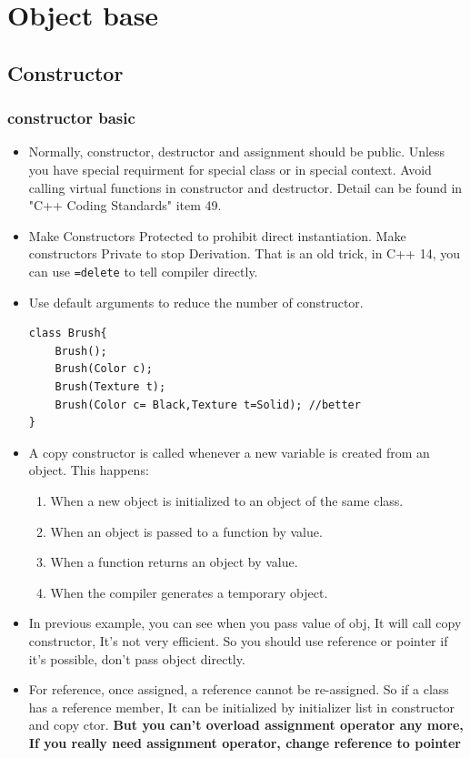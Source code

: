 \documentclass[a4paper,11pt,twoside]{book}
\begin{document}
\section{Object base}
\subsection{Constructor}

\subsubsection{constructor basic}

\begin{itemize}
	\item Normally, constructor, destructor and assignment should be public. Unless you have special requirment for special class or in special context. Avoid calling virtual functions in constructor and destructor. Detail can be found in "C++ Coding Standards" item 49.
	
	\item Make Constructors Protected to prohibit direct instantiation. Make constructors Private to stop Derivation. That is an old trick, in C++ 14, you can use \texttt{=delete} to tell compiler directly.
	
	\item Use default arguments to reduce the number of constructor.
\begin{lstlisting}[numbers=none]
class Brush{
	Brush();
	Brush(Color c);
	Brush(Texture t);
	Brush(Color c= Black,Texture t=Solid); //better
}
\end{lstlisting}
		
		\item A copy constructor is called whenever a new variable is created from an object. This happens:
		
		\begin{enumerate}
			\item When a new object is initialized to an object of the same class.
			\item When an object is passed to a function by value.
			\item When a function returns an object by value.
			\item When the compiler generates a temporary object.
		\end{enumerate}
		
		\item In previous example, you can see when you pass value of obj, It will call copy constructor, It's not very efficient. So you should use reference or pointer if it's possible, don't pass object directly.
		
		\item For reference, once assigned, a reference cannot be re-assigned. So if a class has a reference member, It can be initialized by initializer list in constructor and copy ctor. \textbf{But you can't overload assignment operator any more, If you really need assignment operator, change reference to pointer}
		
\end{itemize}
\end{document}
